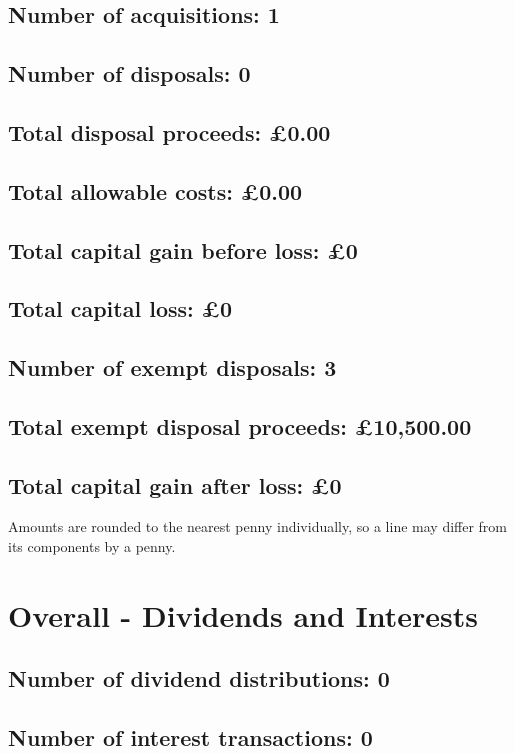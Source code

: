 \documentclass{article}
\begin{document}
\subsection*{Number of acquisitions: 1}
\subsection*{Number of disposals: 0}
\subsection*{Total disposal proceeds: £0.00}
\subsection*{Total allowable costs: £0.00}
\subsection*{Total capital gain before loss: £0}
\subsection*{Total capital loss: £0}
\subsection*{Number of exempt disposals: 3}
\subsection*{Total exempt disposal proceeds: £10,500.00}
\subsection*{Total capital gain after loss: £0}
\vspace{1em}
Amounts are rounded to the nearest penny individually, so a line may differ from its components by a penny.
\vspace{2em}
\section*{Overall - Dividends and Interests}
\subsection*{Number of dividend distributions: 0}
\subsection*{Number of interest transactions: 0}
\end{document}
